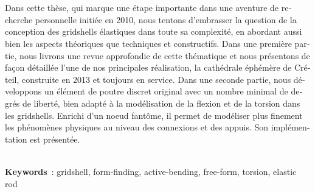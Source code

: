 \begin{otherlanguage}{french}
\\
\\
Dans cette thèse, qui marque une étape importante dans une aventure de recherche personnelle initiée en 2010, nous tentons d'embrasser la question de la conception des gridshells élastiques dans toute sa complexité, en abordant aussi bien les aspects théoriques que techniques et constructifs. Dans une première partie, nous livrons une revue approfondie de cette thématique et nous présentons de façon détaillée l'une de nos principales réalisation, la cathédrale éphémère de Créteil, construite en 2013 et toujours en service. Dans une seconde partie, nous développons un élément de poutre discret original avec un nombre minimal de degrés de liberté, bien adapté à la modélisation de la flexion et de la torsion dans les gridshells. Enrichi d'un noeud fantôme, il permet de modéliser plus finement les phénomènes physiques au niveau des connexions et des appuis. Son implémentation est présentée.

%
%
%
%
%
%
%
%
%
%
%
%
%
%
%
%
%
%
%
%
\vspace{12pt}\\
\textbf{Keywords}~: gridshell, form-finding, active-bending, free-form, torsion, elastic rod
\end{otherlanguage}
